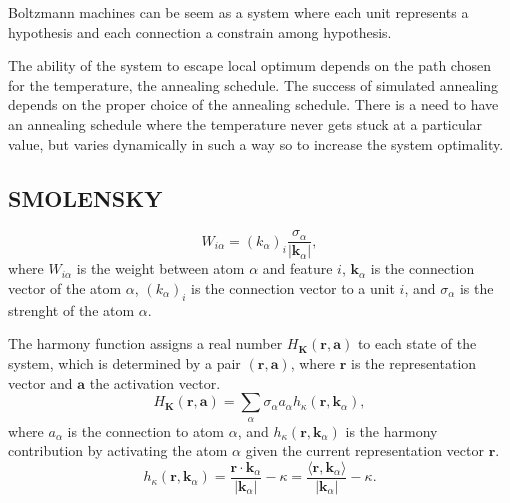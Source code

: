 Boltzmann machines can be seem as a system where each unit represents a hypothesis and each connection a constrain among hypothesis. 

The ability of the system to escape local optimum depends on the path chosen for the temperature, the annealing schedule. The success of simulated annealing depends on the proper choice of the annealing schedule.
There is a need to have an annealing schedule where the temperature never gets stuck at a particular value, but varies dynamically in such a way so to increase the system optimality.


\subsection{SMOLENSKY}

\begin{equation}
    \label{eq:smolensky-weights}
    W_{i \alpha} = {\left( k_{\alpha} \right)}_{i} \frac{\sigma_{\alpha}}{|\mathbf{k}_{\alpha}|},
\end{equation}
where $W_{i \alpha}$ is the weight between atom $\alpha$ and feature $i$, $\mathbf{k}_{\alpha}$ is the connection vector of the atom $\alpha$, ${\left( k_{\alpha} \right)}_{i}$ is the connection vector to a unit $i$, and $\sigma_{\alpha}$ is the strenght of the atom $\alpha$.

The harmony function assigns a real number $H_{\mathbf{K}}(\mathbf{r}, \mathbf{a}) $ to each state of the system, which is determined by a pair $(\mathbf{r}, \mathbf{a})$, where $\mathbf{r}$ is the representation vector and $\mathbf{a}$ the activation vector.
\begin{equation}
    \label{eq:smolensky-harmonyfunction}
    H_{\mathbf{K}}(\mathbf{r}, \mathbf{a}) = \sum_{\alpha} \sigma_{\alpha} a_{\alpha} h_{\kappa}(\mathbf{r}, \mathbf{k}_{\alpha}),
\end{equation}
where $a_{\alpha}$ is the connection to atom $\alpha$, and $h_{\kappa}(\mathbf{r}, \mathbf{k}_{\alpha})$ is the harmony contribution by activating the atom $\alpha$ given the current representation vector $\mathbf{r}$.
\begin{equation}
    \label{eq:smolensky-harmonyatom}
    h_{\kappa}(\mathbf{r}, \mathbf{k}_{\alpha}) = \frac{\mathbf{r} \cdot \mathbf{k}_{\alpha}}{|\mathbf{k}_{\alpha}|} - \kappa
    = \frac{\langle \mathbf{r}, \mathbf{k}_{\alpha} \rangle}{|\mathbf{k}_{\alpha}|} - \kappa.
\end{equation}

